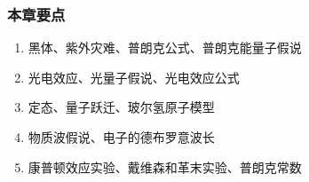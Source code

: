 \begin{frame}
    \frametitle{本章要点}
    \begin{enumerate}
        \item 黑体、紫外灾难、普朗克公式、普朗克能量子假说
        \item 光电效应、光量子假说、光电效应公式
        \item 定态、量子跃迁、玻尔氢原子模型
        \item 物质波假说、电子的德布罗意波长
        \item 康普顿效应实验、戴维森和革末实验、普朗克常数
    \end{enumerate}
\end{frame}
